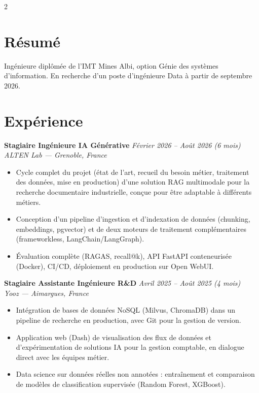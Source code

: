 \documentclass[10.5pt,a4paper]{article}
\newcommand{\sectionrule}{\vspace{-6pt}{\color{accent}\hrule height 1pt}\vspace{3pt}}
\newcommand{\cvexp}[5]{%
  \noindent\textbf{#1} \hfill {\itshape\color{graytext}\small #4}\\
  {\itshape #2 --- #3}\\[-2pt]
  #5
  \vspace{10pt}
}
\begin{document}
\setlength{\columnsep}{1.5em}
\begin{paracol}{2}

\section*{Résumé}
\sectionrule
\justifying
Ingénieure diplômée de l'IMT Mines Albi, option Génie des systèmes d'information. En recherche d'un poste d'ingénieure Data à partir de septembre 2026.

\section*{Expérience}
\sectionrule

\cvexp{Stagiaire Ingénieure IA Générative}{ALTEN Lab}{Grenoble, France}{Février 2026 -- Août 2026 (6 mois)}{%
  \begin{itemize}[leftmargin=12pt, itemsep=2pt, topsep=0pt, partopsep=0pt, parsep=0pt]
    \item Cycle complet du projet (état de l'art, recueil du besoin métier, traitement des données, mise en production) d'une solution RAG multimodale pour la recherche documentaire industrielle, conçue pour être adaptable à différents métiers.
    \item Conception d'un pipeline d'ingestion et d'indexation de données (chunking, embeddings, pgvector) et de deux moteurs de traitement complémentaires (frameworkless, LangChain/\allowbreak LangGraph).
    \item Évaluation complète (RAGAS, recall@k), API FastAPI conteneurisée (Docker), CI/CD, déploiement en production sur Open WebUI.
  \end{itemize}
}

\cvexp{Stagiaire Assistante Ingénieure R\&D}{Yooz}{Aimargues, France}{Avril 2025 -- Août 2025 (4 mois)}{%
  \begin{itemize}[leftmargin=12pt, itemsep=2pt, topsep=0pt, partopsep=0pt, parsep=0pt]
    \item Intégration de bases de données NoSQL (Milvus, ChromaDB) dans un pipeline de recherche en production, avec Git pour la gestion de version.
    \item Application web (Dash) de visualisation des flux de données et d'expérimentation de solutions IA pour la gestion comptable, en dialogue direct avec les équipes métier.
    \item Data science sur données réelles non annotées : entraînement et comparaison de modèles de classification supervisée (Random Forest, XGBoost).
  \end{itemize}
}


\end{paracol}
\end{document}
